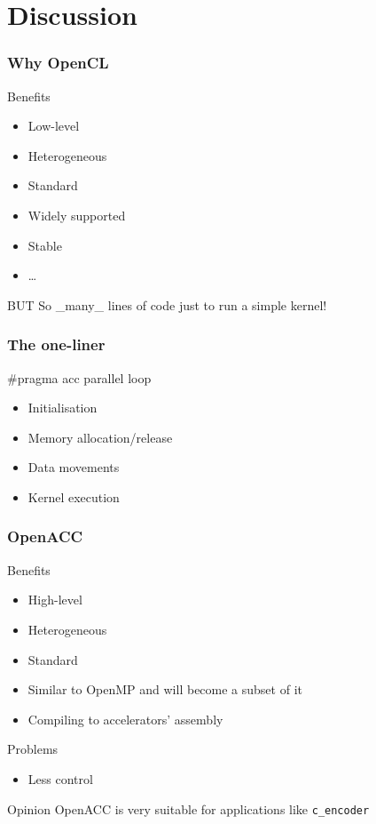 \section{Discussion}
\begin{frame}
  \frametitle{Why OpenCL}
  \begin{block}{Benefits}
    \begin{itemize}
    \item Low-level
    \item Heterogeneous
    \item Standard
    \item Widely supported
    \item Stable
    \item \ldots
    \end{itemize}
  \end{block}
  \pause{}
  \begin{alertblock}{BUT}
    So \_many\_ lines of code just to run a simple kernel!
  \end{alertblock}
\end{frame}

\begin{frame}
  \frametitle{The one-liner}
  \pause{}
   \pause{}
  \begin{alertblock}{\#pragma acc parallel loop}
    \begin{itemize}
    \item Initialisation
    \item Memory allocation/release
    \item Data movements
    \item Kernel execution
    \end{itemize}
  \end{alertblock}
\end{frame}

\begin{frame}
  \frametitle{OpenACC}
  \begin{block}{Benefits}
    \begin{itemize}
    \item High-level
    \item Heterogeneous
    \item Standard
    \item Similar to OpenMP and will become a subset of it
    \item Compiling to accelerators' assembly
    \end{itemize}
  \end{block}
  \begin{block}{Problems}
    \begin{itemize}
    \item Less control
    \end{itemize}
  \end{block}
  \begin{alertblock}{Opinion}
    OpenACC is very suitable for applications like \texttt{c\_encoder}
  \end{alertblock}
\end{frame}


